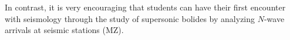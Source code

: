\documentclass[linenum]{SSA-SRL}
\begin{document}
In contrast, it is very encouraging that students can have their first encounter with seismology through the study of supersonic bolides by analyzing \( N \)-wave arrivals at seismic stations (MZ).

\end{document}
